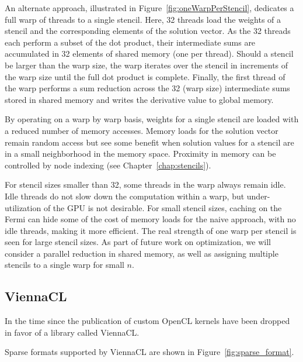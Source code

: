 \documentclass{report}
\begin{document}
An alternate approach, illustrated in Figure~\ref{fig:oneWarpPerStencil}, dedicates a full warp of threads to a single stencil. Here, 32 threads load the weights of a stencil and the corresponding elements of the solution vector. As the 32 threads each perform a subset of the dot product, their intermediate sums are accumulated in 32 elements of shared memory (one per thread).
Should  a stencil be larger than the warp size, the warp iterates over the stencil in increments of the warp size until the full dot product is complete. Finally, the first thread of the warp performs a sum reduction across the 32 (warp size)  intermediate sums stored in shared memory and writes the derivative value to global memory. 

By operating on a warp by warp basis, weights for a single stencil are loaded with a reduced number of memory accesses. Memory loads for the solution vector remain random access but see some benefit when solution values for a stencil are in a small neighborhood in the memory space. Proximity in memory can be controlled by node indexing (see Chapter~\ref{chap:stencils}). 

For stencil sizes smaller than 32, some threads in the warp always remain idle. Idle threads do not slow down the computation within a warp, but under-utilization of the GPU is not desirable. For small stencil sizes, caching on the Fermi can hide some of the cost of memory loads for the naive approach, with no idle threads, making it more efficient. The real strength of one warp per stencil is seen for large stencil sizes. 
As part of future work on optimization, we will consider a parallel reduction in shared memory, as well as assigning multiple stencils to a single warp for small  $n$. 





\subsection{ViennaCL} 


In the time since the publication of \cite{BolligFlyerErlebacher2012} custom OpenCL kernels have been dropped in favor of a library called ViennaCL. 

Sparse formats supported by ViennaCL are shown in Figure~\ref{fig:sparse_format}.
\end{document}
